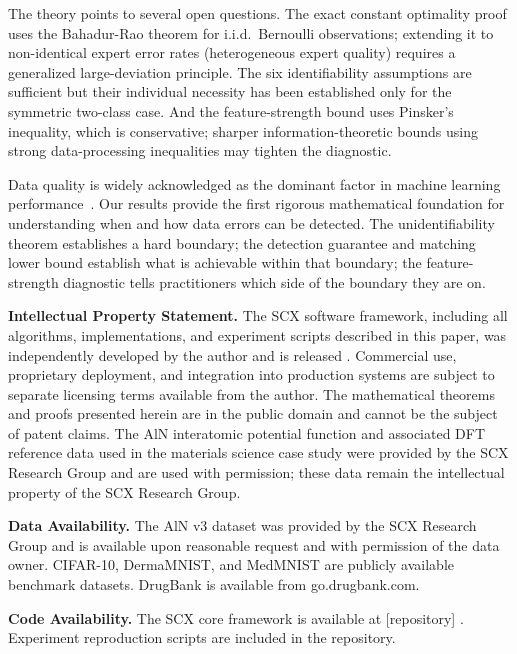 \documentclass[12pt,a4paper]{article}
\begin{document}
The theory points to several open questions. The exact constant optimality proof uses the Bahadur-Rao theorem for i.i.d.\ Bernoulli observations; extending it to non-identical expert error rates (heterogeneous expert quality) requires a generalized large-deviation principle. The six identifiability assumptions are sufficient but their individual necessity has been established only for the symmetric two-class case. And the feature-strength bound uses Pinsker's inequality, which is conservative; sharper information-theoretic bounds using strong data-processing inequalities may tighten the diagnostic.

Data quality is widely acknowledged as the dominant factor in machine learning performance~\cite{sambasivan2021}. Our results provide the first rigorous mathematical foundation for understanding when and how data errors can be detected. The unidentifiability theorem establishes a hard boundary; the detection guarantee and matching lower bound establish what is achievable within that boundary; the feature-strength diagnostic tells practitioners which side of the boundary they are on.

\begin{flushleft}
\end{flushleft}

\textbf{Intellectual Property Statement.}
The SCX software framework, including all algorithms, implementations, and experiment scripts described in this paper, was independently developed by the author and is released . Commercial use, proprietary deployment, and integration into production systems are subject to separate licensing terms available from the author. The mathematical theorems and proofs presented herein are in the public domain and cannot be the subject of patent claims. The AlN interatomic potential function and associated DFT reference data used in the materials science case study were provided by the SCX Research Group and are used with permission; these data remain the intellectual property of the SCX Research Group.

\textbf{Data Availability.}
The AlN v3 dataset was provided by the SCX Research Group and is available upon reasonable request and with permission of the data owner. CIFAR-10, DermaMNIST, and MedMNIST are publicly available benchmark datasets. DrugBank is available from go.drugbank.com.

\textbf{Code Availability.}
The SCX core framework is available at [repository] . Experiment reproduction scripts are included in the repository.
\end{document}
